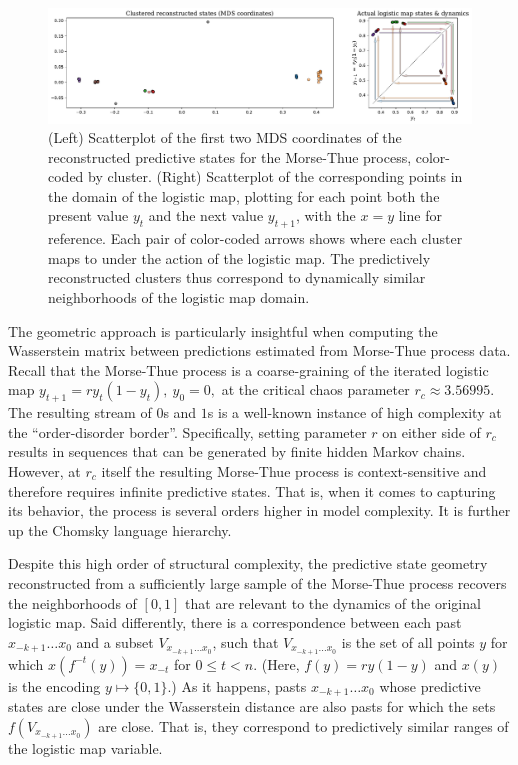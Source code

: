 \documentclass[draft,aps,pre,twocolumn,groupaddress,showkeys,nofootinbib,preprintnumbers,floatfix]{revtex4-2}
\begin{document}
\begin{figure}[ht]
\centering
\includegraphics[width=\linewidth]{../plots/feig_MDS.pdf}
\caption{(Left) Scatterplot of the first two MDS coordinates of the
	reconstructed predictive states for the Morse-Thue process, color-coded by
	cluster. (Right) Scatterplot of the corresponding points in the domain of
	the logistic map, plotting for each point both the present value $y_t$ and
	the next value $y_{t+1}$, with the $x=y$ line for reference. Each pair of
	color-coded arrows shows where each cluster maps to under the action of the
	logistic map. The predictively reconstructed clusters thus correspond to
	dynamically similar neighborhoods of the logistic map domain.
	}
\label{fig:mds-feig}
\end{figure}

The geometric approach is particularly insightful when computing the
Wasserstein matrix between predictions estimated from Morse-Thue process data.
Recall that the Morse-Thue process is a coarse-graining of the iterated
logistic map $y_{t+1} = ry_t(1-y_t), ~y_0 = 0,$ at the critical chaos parameter $r_c
\approx 3.56995$. The resulting stream of $0$s and $1$s is a well-known
instance of high complexity at the ``order-disorder border''. Specifically,
setting parameter $r$ on either side of $r_c$ results in sequences that
can be generated by finite hidden Markov chains. However, at $r_c$ itself the
resulting Morse-Thue process is context-sensitive and therefore requires
infinite predictive states. That is, when it comes to capturing its behavior,
the process is several orders higher in model complexity. It is further up the
Chomsky language hierarchy.

Despite this high order of structural complexity, the predictive state geometry
reconstructed from a sufficiently large sample of the Morse-Thue process
recovers the neighborhoods of $[0,1]$ that are relevant to the dynamics of the
original logistic map. Said differently, there is a correspondence between each
past $x_{-k+1}\dots x_{0}$ and a subset $V_{x_{-k+1}\dots x_{0}}$, such that
$V_{x_{-k+1}\dots x_{0}}$ is the set of all points $y$ for which $x(f^{-t}(y)) =
x_{-t}$ for $0\leq t < n$. (Here, $f(y) = ry(1-y)$ and $x(y)$ is the encoding
$y\mapsto \{0,1\}$.) As it happens, pasts $x_{-k+1}\dots x_{0}$ whose predictive
states are close under the Wasserstein distance are also pasts for which the
sets $f(V_{x_{-k+1}\dots x_{0}})$ are close. That is, they correspond to
predictively similar ranges of the logistic map variable. 
\end{document}
